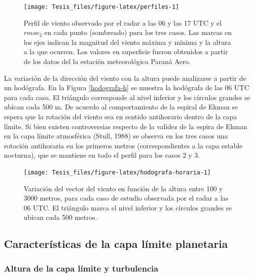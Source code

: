 \documentclass[12pt,spanish,oneside, a4paper]{book}
\begin{document}
\begin{figure}

{\centering \texttt{[image: Tesis\_files/figure-latex/perfiles-1]} 

}

\caption{Perfil de viento observado por el radar a las 06 y las 17 UTC y el $rmse_2$ en cada punto (sombreado) para los tres casos. Las marcas en los ejes indican la magnitud del viento máxima y mínima y la altura a la que ocurren. Los valores en superficie fueron obtenidos a partir de los datos del la estación meteorológica Paraná Aero. \label{perfiles-horarios}}\label{fig:perfiles}
\end{figure}

La variación de la dirección del viento con la altura puede analizarse a
partir de un hodógrafa. En la Figura \ref{hodografa-h} se muestra la
hodógrafa de las 06 UTC para cada caso. El triángulo corresponde al
nivel inferior y los círculos grandes se ubican cada 500 m. De acuerdo
al comportamiento de la espiral de Ekman se espera que la rotación del
viento sea en sentido antihorario dentro de la capa límite. Si bien
existen controversias respecto de la validez de la espira de Ekman en la
capa límite atmosférica (Stull, 1988) se observa en los tres casos una
rotación antihoraria en los primeros metros (correspondientes a la capa
estable nocturna), que se mantiene en todo el perfil para los casos 2 y
3.

\begin{figure}

{\centering \texttt{[image: Tesis\_files/figure-latex/hodografa-horaria-1]} 

}

\caption{Variación del vector del viento en función de la altura entre 100 y 3000 metros, para cada caso de estudio observada por el radar a las 06 UTC. El triángulo marca el nivel inferior y los círculos grandes se ubican cada 500 metros. \label{hodografa-h}}\label{fig:hodografa-horaria}
\end{figure}

\subsection{Características de la capa límite
planetaria}\label{caracteristicas-de-la-capa-limite-planetaria}

\subsubsection{Altura de la capa límite y
turbulencia}\label{altura-de-la-capa-limite-y-turbulencia}
\end{document}

